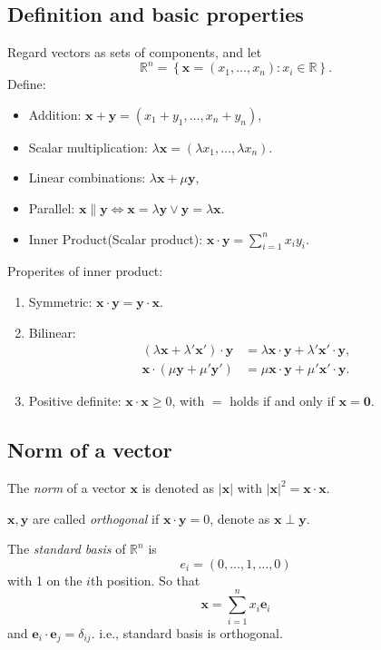 \documentclass[10pt]{article}
\def\ge{\geqslant}
\begin{document}
    \subsection{Definition and basic properties}
    \begin{definition}
        Regard vectors as sets of components, and let 
        \[
            \mathbb{R}^n = \left\{ \mathbf{x}=(x_1,\dots, x_n): x_i\in \mathbb{R} \right\}
        .\]
        Define:
        \begin{itemize}
            \item Addition: $ \mathbf{x}+\mathbf{y}=(x_1+y_1,\dots,x_n+y_n) $,
            \item Scalar multiplication: $ \lambda \mathbf{x}=(\lambda x_1,\dots,\lambda x_n) $.
            \item Linear combinations: $ \lambda \mathbf{x}+\mu \mathbf{y} $,
            \item Parallel: $ \mathbf{x} \parallel \mathbf{y} \Leftrightarrow \mathbf{x}=\lambda \mathbf{y} \lor \mathbf{y}=\lambda \mathbf{x} $.
            \item Inner Product(Scalar product): $ \mathbf{x}\cdot \mathbf{y}= \sum_{i=1}^{n} x_iy_i $.
        \end{itemize}
    \end{definition}
    Properites of inner product:
    \begin{enumerate}[(1).]
        \item Symmetric: $ \mathbf{x}\cdot \mathbf{y}=\mathbf{y}\cdot \mathbf{x} $.
        \item Bilinear: 
        \[
            \begin{aligned}
                (\lambda \mathbf{x}+\lambda' \mathbf{x}')\cdot \mathbf{y}&=\lambda \mathbf{x}\cdot \mathbf{y}+\lambda' \mathbf{x}'\cdot \mathbf{y},\\
                \mathbf{x}\cdot (\mu\mathbf{y}+\mu' \mathbf{y}')&=\mu \mathbf{x}\cdot \mathbf{y}+\mu' \mathbf{x}' \cdot \mathbf{y}.
            \end{aligned}
        \]
        \item Positive definite: $ \mathbf{x}\cdot \mathbf{x}\ge 0 $, with $=$ holds if and only if $ \mathbf{x}=\mathbf{0} $.
    \end{enumerate}
    \subsection{Norm of a vector}
    \begin{definition}
        The \textit{norm} of a vector $ \mathbf{x} $ is denoted as $ |\mathbf{x}| $ with $ |\mathbf{x}|^2=\mathbf{x}\cdot \mathbf{x} $.

        $ \mathbf{x},\mathbf{y} $ are called \textit{orthogonal} if $ \mathbf{x}\cdot \mathbf{y}=0 $, denote as $ \mathbf{x} \perp \mathbf{y} $.
    \end{definition}
    The \textit{standard basis} of $ \mathbb{R}^n $ is
    \[
        e_i = (0,\dots,1,\dots,0)
    \]
    with 1 on the $i$th position. So that 
    \[
        \mathbf{x}=\sum_{i=1}^{n}x_i \mathbf{e}_i
    \]
    and $ \mathbf{e}_i \cdot \mathbf{e}_j = \delta_{ij} $. i.e., standard basis is orthogonal.
\end{document}

